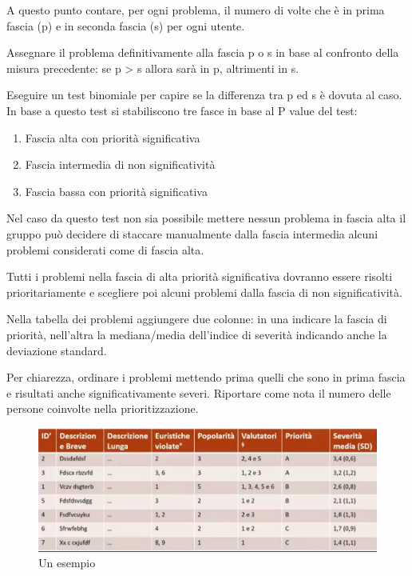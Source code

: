 \documentclass[11pt,a4paper]{book}
\begin{document}
A questo punto contare, per ogni problema, il numero di volte che è in prima fascia (p) e in seconda fascia (s) per ogni utente.

Assegnare il problema definitivamente alla fascia p o s in base al confronto della misura precedente: se p > s allora sarà in p, altrimenti in s.

Eseguire un test binomiale per capire se la differenza tra p ed s è dovuta al caso. In base a questo test si stabiliscono tre fasce in base al P value del test:
\begin{enumerate}
	\item Fascia alta con priorità significativa
	\item Fascia intermedia di non significatività
	\item Fascia bassa con priorità significativa
\end{enumerate}

Nel caso da questo test non sia possibile mettere nessun problema in fascia alta il gruppo può decidere di staccare manualmente dalla fascia intermedia alcuni problemi considerati come di fascia alta.

Tutti i problemi nella fascia di alta priorità significativa dovranno essere risolti prioritariamente e scegliere poi alcuni problemi dalla fascia di non significatività.

Nella tabella dei problemi aggiungere due colonne: in una indicare la fascia di priorità, nell'altra la mediana/media dell'indice di severità indicando anche la deviazione standard.

Per chiarezza, ordinare i problemi mettendo prima quelli che sono in prima fascia e risultati anche significativamente severi. Riportare come nota il numero delle persone coinvolte nella prioritizzazione.

\begin{figure}[h!]
	\begin{center}
		\includegraphics[scale=0.6]{img/018.jpg}
		\caption{Un esempio}
		\label{fig: 018}
	\end{center}
\end{figure}
\end{document}
